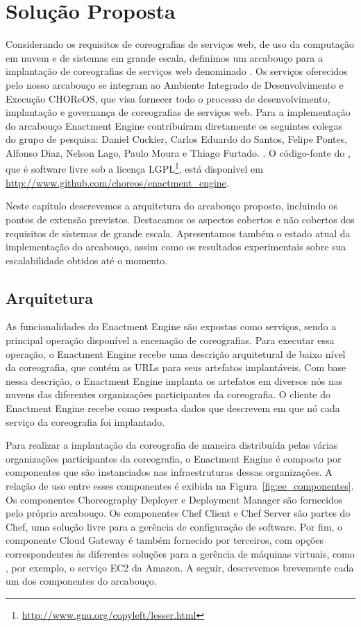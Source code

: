 
\chapter{Solução Proposta}
\label{cap:solucao}

Considerando os requisitos de coreografias de serviços web, de uso da computação em nuvem e de sistemas em grande escala, definimos um arcabouço para a implantação de coreografias de serviços web denominado \ee. Os serviços oferecidos pelo nosso arcabouço se integram ao Ambiente Integrado de Desenvolvimento e Execução CHOReOS, que visa fornecer todo o processo de desenvolvimento, implantação e governança de coreografias de serviços web. Para a implementação do arcabouço Enactment Engine contribuíram diretamente os seguintes colegas do grupo de pesquisa: Daniel Cuckier, Carlos Eduardo do Santos, Felipe Pontes, Alfonso Diaz, Nelson Lago, Paulo Moura e Thiago Furtado. . O código-fonte do \ee, que é software livre sob a licença LGPL\footnote{\url{http://www.gnu.org/copyleft/lesser.html}}, está disponível em \url{http://www.github.com/choreos/enactment\_engine}.

Neste capítulo descrevemos a arquitetura do arcabouço proposto, incluindo os pontos de extensão previstos. Destacamos os aspectos cobertos e não cobertos dos requisitos de sistemas de grande escala. Apresentamos também o estado atual da implementação do arcabouço, assim como os resultados experimentais sobre sua escalabilidade obtidos até o momento.

\section{Arquitetura}
\label{sec:arquitetura}

As funcionalidades do Enactment Engine são expostas como serviços, sendo a principal operação disponível a encenação de coreografias. Para executar essa operação, o Enactment Engine recebe uma descrição arquitetural de baixo nível da coreografia, que contém as URLs para seus artefatos implantáveis. Com base nessa descrição, o Enactment Engine implanta os artefatos em diversos nós nas nuvens das diferentes organizações participantes da coreografia. O cliente do Enactment Engine recebe como resposta dados que descrevem em que nó cada serviço da coreografia foi implantado.

Para realizar a implantação da coreografia de maneira distribuída pelas várias organizações participantes da coreografia, o Enactment Engine é composto por  componentes que são instanciados nas infraestruturas dessas organizações. A relação de uso entre esses componentes é exibida na Figura~\ref{fig:ee_componentes}. Os componentes Choreography Deployer e Deployment Manager são fornecidos pelo próprio arcabouço. Os componentes Chef Client e Chef Server são partes do Chef, uma solução livre para a gerência de configuração de software. Por fim, o componente Cloud Gateway é também fornecido por terceiros, com opções correspondentes às diferentes soluções para a gerência de máquinas virtuais, como , por exemplo, o serviço EC2 da Amazon. A seguir, descrevemos brevemente cada um dos componentes do arcabouço.

